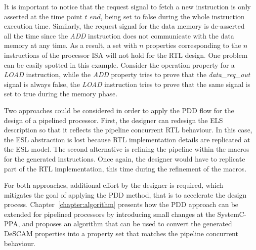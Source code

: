 It is important to notice that the request signal to fetch a new instruction is only asserted at the time point $t\_end$, being set to false during the whole instruction execution time. Similarly, the request signal for the data memory is de-asserted all the time since the \textit{ADD} instruction does not communicate with the data memory at any time. As a result, a set with $n$ properties corresponding to the $n$ instructions of the processor ISA will not hold for the RTL design. One problem can be easily spotted in this example. Consider the operation property for a \textit{LOAD} instruction, while the \textit{ADD} property tries to prove that the \textit{data\_req\_out} signal is always false, the \textit{LOAD} instruction tries to prove that the same signal is set to true during the memory phase.

Two approaches could be considered in order to apply the PDD flow for the design of a pipelined processor. First, the designer can redesign the ELS description so that it reflects the pipeline concurrent RTL behaviour. In this case, the ESL abstraction is lost because RTL implementation details are replicated at the ESL model. The second alternative is refining the pipeline within the macros for the generated instructions. Once again, the designer would have to replicate part of the RTL implementation, this time during the refinement of the macros. 

For both approaches, additional effort by the designer is required, which mitigates the goal of applying the PDD method, that is to accelerate the design process. Chapter~\ref{chapter:algorithm} presents how the PDD approach can be extended for pipelined processors by introducing small changes at the SystemC-PPA, and proposes an algorithm that can be used to convert the generated DeSCAM properties into a property set that matches the pipeline concurrent behaviour. 

